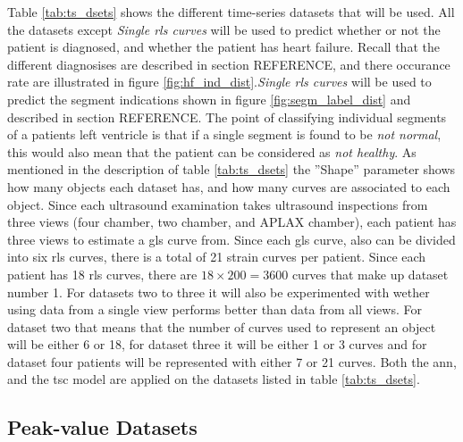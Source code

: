 Table \ref{tab:ts_dsets} shows the different time-series datasets that will be used. 
All the datasets except \textit{Single \acrshort{rls} curves} will be used to predict whether or not the patient is diagnosed, and whether the patient has heart failure. Recall that the different diagnosises are described in section REFERENCE, and there occurance rate are illustrated in figure \ref{fig:hf_ind_dist}.\textit{Single \acrshort{rls} curves} will be used to predict the segment indications shown in figure \ref{fig:segm_label_dist} and described in section REFERENCE. The point of classifying individual segments of a patients left ventricle is that if a single segment is found to be \textit{not normal}, this would also mean that the patient can be considered as \textit{not healthy}. As mentioned in the description of table \ref{tab:ts_dsets} the ''Shape'' parameter shows how many objects each dataset has, and how many curves are associated to each object. Since each ultrasound examination takes ultrasound inspections from three views (four chamber, two chamber, and APLAX chamber), each patient has three views to estimate a \acrshort{gls} curve from. Since each \acrshort{gls} curve, also can be divided into six \acrshort{rls} curves, there is a total of 21 strain curves per patient. Since each patient has 18 \acrshort{rls} curves, there are $18 \times 200 = 3600$ curves that make up dataset number 1. For datasets two to three it will also be experimented with wether using data from a single view performs better than data from all views. For dataset two that means that the number of curves used to represent an object will be either 6 or 18, for dataset three it will be either 1 or 3 curves and for dataset four patients will be represented with either 7 or 21 curves. Both the \acrshort{ann}, and the \acrshort{tsc} model are applied on the datasets listed in table \ref{tab:ts_dsets}. \bigskip

\subsection{Peak-value Datasets}

